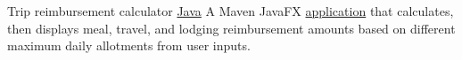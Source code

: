 \datedsubsection{}
{Trip reimbursement calculator}
{\href{https://github.com/JacobArchambault?tab=repositories\&q=\&type=\&language=java}{Java}}
{A Maven JavaFX \href{https://github.com/jacobarchambault/travelexpenses}{application} that calculates, then displays meal, travel, and lodging reimbursement amounts based on different maximum daily allotments from user inputs.}

